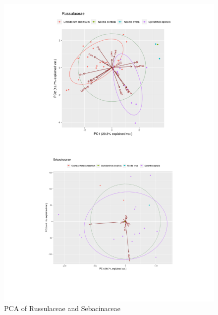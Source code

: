 \begin{figure}[htbp]
\centering
\includegraphics[keepaspectratio,width=\textwidth,height=0.75\textheight]{images/PCArusseb.png}
\caption{PCA of Russulaceae and Sebacinaceae}
\end{figure}

